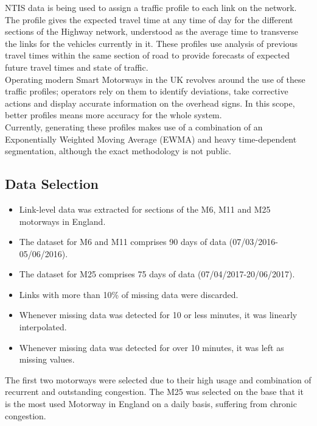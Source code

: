 \documentclass[conference]{IEEEtran}
\begin{document}
NTIS data is being used to assign a traffic profile to each link on the network. 
The profile gives the expected travel time at any time of day for the different sections of the Highway network, understood as the average time to transverse the links for the vehicles currently in it. 
These profiles use analysis of previous travel times within the same section of road to provide forecasts of expected future travel times and state of traffic.\\

Operating modern Smart Motorways in the UK revolves around the use of these traffic profiles; operators rely on them to identify deviations, take corrective actions and display accurate information on the overhead signs. 
In this scope, better profiles means more accuracy for the whole system.\\

Currently, generating these profiles makes use of a combination of an Exponentially Weighted Moving Average (EWMA) and heavy time-dependent segmentation, although the exact methodology is not public. 


\subsection{Data Selection}
\begin{itemize}
	\item Link-level data was extracted for sections of the M6, M11 and M25 motorways in England.
	\item The dataset for M6 and M11 comprises 90 days of data (07/03/2016-05/06/2016).
	\item The dataset for M25 comprises 75 days of data (07/04/2017-20/06/2017).
	\item Links with more than 10\% of missing data were discarded.
	\item Whenever missing data was detected for 10 or less minutes, it was linearly interpolated.
	\item Whenever missing data was detected for over 10 minutes, it was left as missing values.
\end{itemize}
The first two motorways were selected due to their high usage and combination of recurrent and outstanding congestion. 
The M25 was selected on the base that it is the most used Motorway in England on a daily basis, suffering from chronic congestion.
\end{document}
